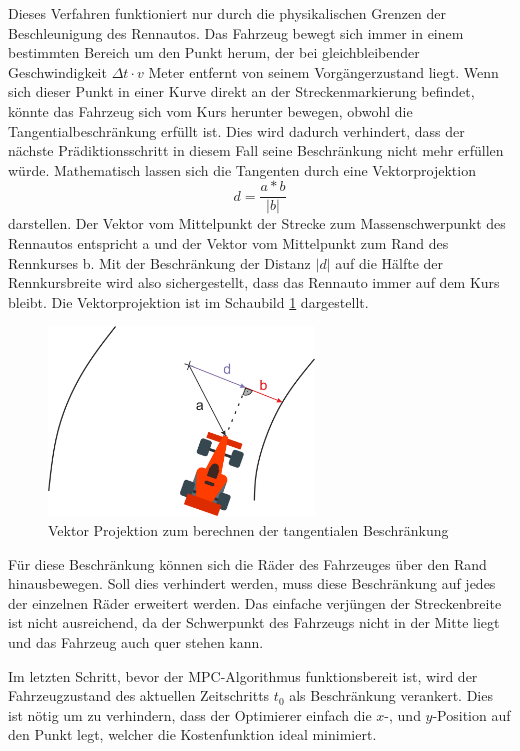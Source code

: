 \documentclass{like}
\begin{document}
Dieses Verfahren funktioniert nur durch die physikalischen Grenzen der Beschleunigung des Rennautos. Das Fahrzeug bewegt sich immer in einem bestimmten Bereich um den Punkt herum, der bei gleichbleibender Geschwindigkeit $\Delta t \cdot v$ Meter entfernt von seinem Vorgängerzustand liegt. Wenn sich dieser Punkt in einer Kurve direkt an der Streckenmarkierung befindet, könnte das Fahrzeug sich vom Kurs herunter bewegen, obwohl die Tangentialbeschränkung erfüllt ist. Dies wird dadurch verhindert, dass der nächste Prädiktionsschritt in diesem Fall seine Beschränkung nicht mehr erfüllen würde.
Mathematisch lassen sich die Tangenten durch eine Vektorprojektion 
\begin{equation}
	d = \frac{a*b}{|b|}
\end{equation}
darstellen. Der Vektor vom Mittelpunkt der Strecke zum Massenschwerpunkt des Rennautos entspricht a und der Vektor vom Mittelpunkt zum Rand des Rennkurses b. Mit der Beschränkung der Distanz $|d|$ auf die Hälfte der Rennkursbreite wird also sichergestellt, dass das Rennauto immer auf dem Kurs bleibt.
Die Vektorprojektion ist im Schaubild \ref{fig:vektorProjektion} dargestellt.

\begin{figure}[ht!]
	\centering
	\includegraphics[width=200pt]{Abbildungen/vektorProjection.png}
	\caption{Vektor Projektion zum berechnen der tangentialen Beschränkung}
	\label{fig:vektorProjektion}
\end{figure}

Für diese Beschränkung können sich die Räder des Fahrzeuges über den Rand hinausbewegen. Soll dies verhindert werden, muss diese Beschränkung auf jedes der einzelnen Räder erweitert werden. Das einfache verjüngen der Streckenbreite ist nicht ausreichend, da der Schwerpunkt des Fahrzeugs nicht in der Mitte liegt und das Fahrzeug auch quer stehen kann.

Im letzten Schritt, bevor der \ac{MPC}-Algorithmus funktionsbereit ist, wird der Fahrzeugzustand des aktuellen Zeitschritts $t_0$ als Beschränkung verankert.  Dies ist nötig um zu verhindern, dass der Optimierer einfach die \(x\)-, und \(y\)-Position auf den Punkt legt, welcher die Kostenfunktion ideal minimiert. 
\end{document}
